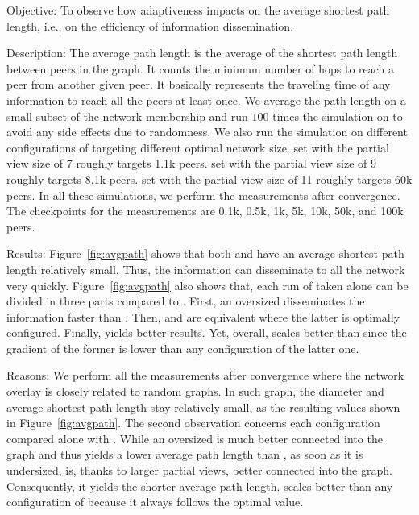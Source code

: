 \begin{asparadesc}
\item[Objective:] To observe how adaptiveness impacts on the average shortest
  path length, i.e., on the efficiency of information dissemination.
\item[Description:] The average path length is the average of the shortest path
  length between peers in the graph. It counts the minimum number of hops to
  reach a peer from another given peer. It basically represents the traveling
  time of any information to reach all the peers at least once. We average the
  path length on a small subset of the network membership and run $100$ times
  the simulation on \SPRAY to avoid any side effects due to randomness. We also
  run the simulation on different configurations of \CYCLON targeting different
  optimal network size. \CYCLON set with the partial view size of 7 roughly
  targets 1.1k peers. \CYCLON set with the partial view size of 9 roughly
  targets 8.1k peers. \CYCLON set with the partial view size of 11 roughly
  targets 60k peers. In all these simulations, we perform the measurements
  after convergence. The checkpoints for the measurements are 0.1k, 0.5k, 1k,
  5k, 10k, 50k, and 100k peers.
\item[Results:] Figure~\ref{fig:avgpath} shows that both \CYCLON and \SPRAY
  have an average shortest path length relatively small. Thus, the information
  can disseminate to all the network very quickly. Figure~\ref{fig:avgpath}
  also shows that, each run of \CYCLON taken alone can be divided in three
  parts compared to \SPRAY. First, an oversized \CYCLON disseminates the
  information faster than \SPRAY. Then, \SPRAY and \CYCLON are equivalent
  where the latter is optimally configured. Finally, \SPRAY yields better
  results. Yet, overall, \SPRAY scales better than \CYCLON since the
  gradient of the former is lower than any configuration of the latter one.
\item[Reasons:] We perform all the measurements after convergence where the
  network overlay is closely related to random graphs. In such graph, the
  diameter and average shortest path length stay relatively small, as the
  resulting values shown in Figure~\ref{fig:avgpath}. The second observation
  concerns each \CYCLON configuration compared alone with \SPRAY. While an
  oversized \CYCLON is much better connected into the graph and thus yields a
  lower average path length than \SPRAY, as soon as it is undersized, \SPRAY
  is, thanks to larger partial views, better connected into the graph.
  Consequently, it yields the shorter average path length. \SPRAY scales better
  than any configuration of \CYCLON because it always follows the optimal
  value.
\end{asparadesc}

